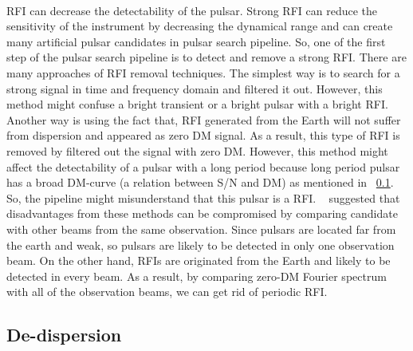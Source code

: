 \documentclass[thesis_msc.tex]{subfiles}
\begin{document}
        \paragraph{} RFI can decrease the detectability of the pulsar. Strong RFI can reduce the sensitivity of the instrument by decreasing the dynamical range and can create many artificial pulsar candidates in pulsar search pipeline. So, one of the first step of the pulsar search pipeline is to detect and remove a strong RFI. 
        There are many approaches of RFI removal techniques. The simplest way is to search for a strong signal in time and frequency domain and filtered it out. However, this method might confuse a bright transient or a bright pulsar with a bright RFI. Another way is using the fact that, RFI generated from the Earth will not suffer from dispersion and appeared as zero DM signal. As a result, this type of RFI is removed by filtered out the signal with zero DM. However, this method might affect the detectability of a pulsar with a long period because long period pulsar has a broad DM-curve (a relation between S/N and DM) as mentioned in ~\ref{DDM}. So, the pipeline might misunderstand that this pulsar is a RFI. ~\cite{Ng} suggested that disadvantages from these methods can be compromised by comparing candidate with other beams from the same observation. Since pulsars are located far from the earth and weak, so pulsars are likely to be detected in only one observation beam. On the other hand, RFIs are originated from the Earth and likely to be detected in every beam. As a result, by comparing zero-DM Fourier spectrum with all of the observation beams, we can get rid of periodic RFI.     
        
        \subsection{De-dispersion} \label{DDM}
\end{document}
